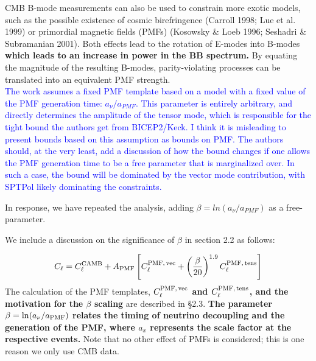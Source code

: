\documentclass{article}
\newcommand{\cpmftens}{\ensuremath{C_{\ell}^{\rm PMF,\,tens}}}
\newcommand{\cpmfvec}{\ensuremath{C_{\ell}^{\rm PMF,\,vec}}}
\newcommand{\apmf}{\ensuremath{A_{\rm PMF}}}
\newcommand{\be}{\begin{equation}}
\newcommand{\ee}{\end{equation}}
\newcommand{\added}[1]{\textbf{#1}}
\newcommand{\reviewer}[1]{\textcolor{Blue}{#1}}
\newcommand{\diff}[1]{\textcolor{PineGreen}{#1}}
\begin{document}
\diff{CMB B-mode measurements can also be used to constrain more exotic models, such as the possible existence of cosmic birefringence (Carroll 1998; Lue et al. 1999) or primordial magnetic fields (PMFs) (Kosowsky & Loeb
1996; Seshadri & Subramanian 2001).  
Both effects lead to the rotation of E-modes into B-modes \textbf{which leads to an increase in power in the BB spectrum.}
By equating the magnitude of the resulting B-modes, parity-violating processes can be translated into an equivalent PMF strength.\\


\reviewer{The work assumes a fixed PMF template based on a model with a fixed value of the PMF generation time: $a_{\nu}/a_{PMF}$. This parameter is entirely arbitrary, and directly determines the amplitude of the tensor mode, which is responsible for the tight bound the authors get from BICEP2/Keck. I think it is misleading to present bounds based on this assumption as bounds on PMF. The authors should, at the very least, add a discussion of how the bound changes if one allows the PMF generation time to be a free parameter that is marginalized over. In such a case, the bound will be dominated by the vector mode contribution, with SPTPol likely dominating the constraints.}

In response, we have repeated the analysis, adding $\beta = ln(a_{\nu}/a_{PMF})$ as a free-parameter.

We include a discussion on the significance of $\beta$ in section 2.2 as follows:

\diff{
\be
C_\ell = C_\ell^{\rm{CAMB}} + \apmf \left[\cpmfvec + \left(\frac{\beta}{20}\right)^{1.9}  \cpmftens \right]
\ee
The calculation of the PMF templates,\added{ \cpmfvec{} and \cpmftens{}, and the motivation for the $\beta$ scaling} are described in \S 2.3. 
\added{The parameter $\beta = {\rm ln}(a_{\nu}/a_{\rm{PMF}})$ relates the timing of neutrino decoupling and the generation of the PMF, where $a_x$ represents the scale factor at the respective events.} Note that no other effect of  PMFs is considered; this is one reason we only use CMB data.}

}
\end{document}
